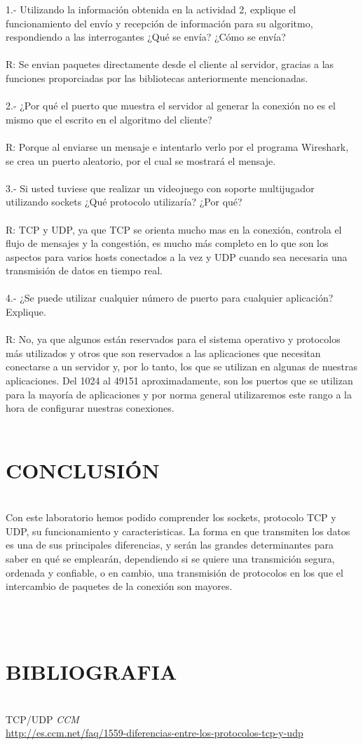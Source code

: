 \documentclass[onecolumn,12pt]{IEEEtran}
\begin{document}
1.- Utilizando la información obtenida en la actividad 2, explique el funcionamiento del envío y recepción de información para su algoritmo, respondiendo a las interrogantes ¿Qué se envía? ¿Cómo se envía?\\ \\
R: Se envian paquetes directamente desde el cliente al servidor, gracias a las funciones proporciadas por las bibliotecas anteriormente mencionadas.
\\ \\
2.- ¿Por qué el puerto que muestra el servidor al generar la conexión no es el mismo que el escrito en el
algoritmo del cliente?\\ \\
R: Porque al enviarse un mensaje e intentarlo verlo por el programa Wireshark, se crea un puerto aleatorio, por el cual se mostrará el mensaje.
\\ \\
3.- Si usted tuviese que realizar un videojuego con soporte multijugador utilizando sockets ¿Qué protocolo
utilizaría? ¿Por qué?\\ \\
R: TCP y UDP, ya que TCP se orienta mucho mas en la conexión, controla el flujo de mensajes y la congestión, es mucho más completo en lo que son los aspectos para varios hosts conectados a la vez y UDP cuando sea necesaria una transmisión de datos en tiempo real.
\\ \\
4.- ¿Se puede utilizar cualquier número de puerto para cualquier aplicación? Explique.\\ \\
R: No, ya que algunos están reservados para el sistema operativo y protocolos más utilizados y otros que son reservados a las aplicaciones que necesitan conectarse a un servidor y, por lo tanto, los que se utilizan en algunas de nuestras aplicaciones. Del 1024 al 49151 aproximadamente, son los puertos que se utilizan para la mayoría de aplicaciones y por norma general utilizaremos este rango a la hora de configurar nuestras conexiones.
\\ \\

\newpage
\section{CONCLUSIÓN}
\hfill \\

Con este laboratorio hemos podido comprender los sockets, protocolo TCP y UDP, su funcionamiento y caracteristicas. La forma en que transmiten los datos es una de sus principales diferencias, y serán las grandes determinantes para saber en qué se emplearán, dependiendo si se quiere una transmición segura, ordenada  y confiable, o en cambio, una transmisión de protocolos en los que el intercambio de paquetes de la conexión son mayores.

\hfill \\
\hfill \\
\section{BIBLIOGRAFIA}
\hfill \\
TCP/UDP 
\emph{CCM} \\
\url{http://es.ccm.net/faq/1559-diferencias-entre-los-protocolos-tcp-y-udp}
\end{document}
